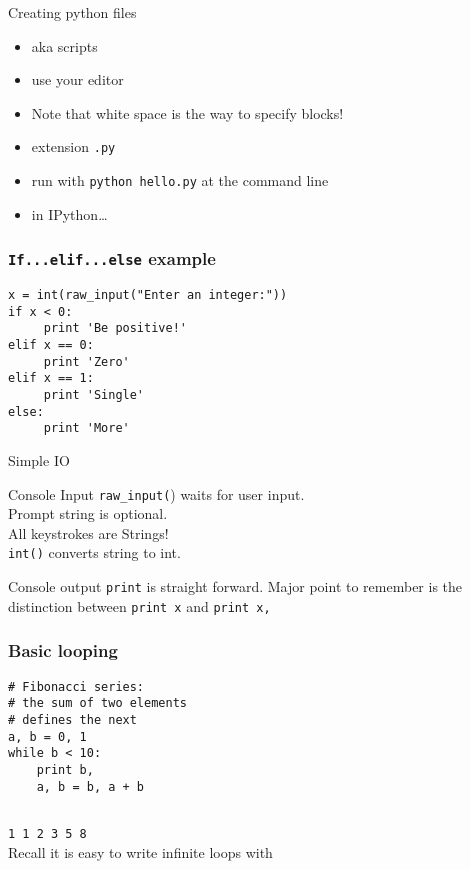 \documentclass[14pt,compress]{beamer}
\newcounter{time}
\newcommand{\inctime}[1]{\addtocounter{time}{#1}{\tiny \thetime\ m}}
\newcommand{\typ}[1]{\texttt{#1}}
\newcommand{\kwrd}[1]{ \texttt{\textbf{\color{blue}{#1}}}  }
\begin{document}
\begin{frame}
  {Creating python files}
  \begin{itemize}
    \item aka scripts
    \item use your editor
    \item Note that white space is the way to specify blocks!
    \item extension \typ{.py}
    \item run with \texttt{python hello.py} at the command line
    \item in IPython\ldots
  \end{itemize}
\end{frame}

\begin{frame}[fragile]
  \frametitle{\typ{If...elif...else} example}
\begin{lstlisting}
x = int(raw_input("Enter an integer:"))
if x < 0:
     print 'Be positive!'
elif x == 0:
     print 'Zero'
elif x == 1:
     print 'Single'
else:
     print 'More'
\end{lstlisting}
\end{frame}

\begin{frame}{Simple IO}
  \begin{block}
    {Console Input}
    \texttt{raw\_input(}) waits for user input.\\Prompt string is optional.\\
    All keystrokes are Strings!\\\texttt{int()} converts string to int.
  \end{block}
  \begin{block}
    {Console output}
    \texttt{print} is straight forward. Major point to remember is the distinction between \texttt{print x} and \texttt{print x,}
  \end{block}
\end{frame}

\begin{frame}[fragile]
  \frametitle{Basic looping}
  \begin{lstlisting}
# Fibonacci series:
# the sum of two elements
# defines the next
a, b = 0, 1
while b < 10:
    print b,
    a, b = b, a + b
 
\end{lstlisting}
\typ{1 1 2 3 5 8}\\  
\alert{Recall it is easy to write infinite loops with \kwrd{while}}
  \inctime{20}
\end{frame}
\end{document}
